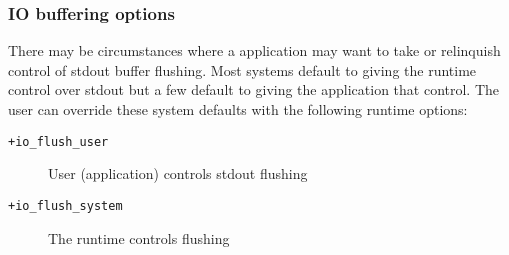 \subsubsection{IO buffering options}
\label{io buffer options}
There may be circumstances where a \charmpp{} application may want to take
or relinquish control of stdout buffer flushing. Most systems default to
giving the \charmpp{} runtime control over stdout but a few default to
giving the application that control. The user can override these system
defaults with the following runtime options:

\begin{description}
\item[{\tt +io\_flush\_user}]     User (application) controls stdout flushing
\item[{\tt +io\_flush\_system}]   The \charmpp{} runtime controls flushing
\end{description}
